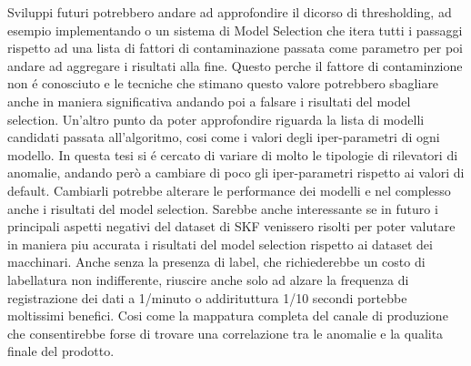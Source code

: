 Sviluppi futuri potrebbero andare ad approfondire il dicorso di thresholding, ad esempio implementando o un sistema di Model Selection che itera tutti i passaggi rispetto ad una lista di fattori di contaminazione passata come parametro per poi andare ad aggregare i risultati alla fine. Questo perche il fattore di contaminzione non é conosciuto e le tecniche che stimano questo valore potrebbero sbagliare anche in maniera significativa andando poi a falsare i risultati del model selection.
Un'altro punto da poter approfondire riguarda la lista di modelli candidati passata all'algoritmo, cosi come i valori degli iper-parametri di ogni modello. In questa tesi si é cercato di variare di molto le tipologie di rilevatori di anomalie, andando però a cambiare di poco gli iper-parametri rispetto ai valori di default. Cambiarli potrebbe alterare le performance dei modelli e nel complesso anche i risultati del model selection.
Sarebbe anche interessante se in futuro i principali aspetti negativi del dataset di SKF venissero risolti per poter valutare in maniera piu accurata i risultati del model selection rispetto ai dataset dei macchinari. Anche senza la presenza di label, che richiederebbe un costo di labellatura non indifferente, riuscire anche solo ad alzare la frequenza di registrazione dei dati a 1/minuto o addirituttura 1/10 secondi portebbe moltissimi benefici. Cosi come la mappatura completa del canale di produzione che consentirebbe forse di trovare una correlazione tra le anomalie e la qualita finale del prodotto.